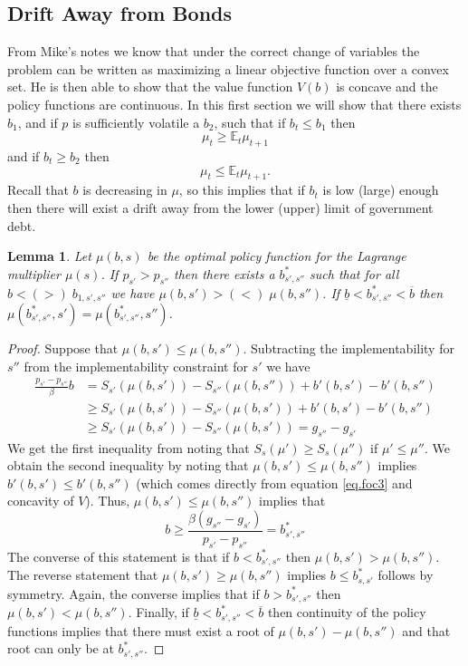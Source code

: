 \documentclass[12pt]{article}
\newcommand{\EE}{\mathbb E}
\newtheorem{lemma}{Lemma}
\begin{document}
\subsection{Drift Away from Bonds}
From Mike's notes we know that under the correct change of variables the problem can be written as maximizing a linear objective function over a convex set.  He is then able to show that the value function $V(b)$ is concave and the policy functions are continuous.  In this first section we will show that there exists $b_1$, and if $p$ is sufficiently volatile a $b_2$, such that if $b_t\leq b_1$ then 
\[
	\mu_t \geq \EE_t \mu_{t+1}
\] and if $b_t \geq b_2$ then
\[
	\mu_t \leq \EE_t \mu_{t+1}.
\]  Recall that $b$ is decreasing in $\mu$, so this implies that if $b_t$ is low (large) enough then there will exist a drift away from the lower (upper) limit of government debt.
\begin{lemma}  Let $\mu(b,s)$ be the optimal policy function for the Lagrange multiplier $\mu(s)$.  If $p_{s'} > p_{s''}$ then there exists a $b^*_{s',s''}$ such that for all $b < (>) \; b_{1,s',s''}$ we have $\mu(b,s') > (<) \;\mu(b,s'')$.  If $\underline b < b^*_{s',s''} < \overline b$ then $\mu(b^*_{s',s''},s') = \mu(b^*_{s',s''},s'')$.
\label{lem.order}
\end{lemma}
\begin{proof} 
Suppose that $\mu(b,s')\leq \mu(b,s'')$.  Subtracting the implementability for $s''$ from the implementability constraint for $s'$ we have 
\begin{align*}
	\frac{p_{s'}-p_{s''}}{\beta}b &= S_{s'}(\mu(b,s'))-S_{s''}(\mu(b,s'')) + b'(b,s')-b'(b,s'')\\
						&\geq S_{s'}(\mu(b,s')) -S_{s''}(\mu(b,s')) + b'(b,s')-b'(b,s'')\\
						&\geq  S_{s'}(\mu(b,s')) -S_{s''}(\mu(b,s')) = g_{s''}-g_{s'}
\end{align*}  We get the first inequality from noting that $S_s(\mu')\geq S_s(\mu'')$ if $\mu' \leq \mu''$.  We obtain the second inequality by noting that $\mu(b,s')\leq \mu(b,s'')$ implies $b'(b,s')\leq b'(b,s'')$ (which comes directly from equation \eqref{eq.foc3} and concavity of $V$).  Thus, $\mu(b,s')\leq \mu(b,s'')$ implies that 
\[
	b \geq \frac{\beta(g_{s''}-g_{s'})}{p_{s'}-p_{s''}} = b^*_{s',s''}
\]The converse of this statement is that if $b<b^*_{s',s''}$ then $\mu(b,s') > \mu(b,s'')$.  The reverse statement that $\mu(b,s') \geq \mu(b,s'')$ implies $b \leq b^*_{s,s'}$ follows by symmetry.   Again, the converse implies that if $b > b^*_{s',s''}$ then $\mu(b,s') < \mu(b,s'')$.    Finally, if $\underline b < b^*_{s',s''} <\overline b$ then continuity of the policy functions implies that there must exist a root of $\mu(b,s')-\mu(b,s'')$ and that root can only be at $b^*_{s',s''}$.
\end{proof}
\end{document}

